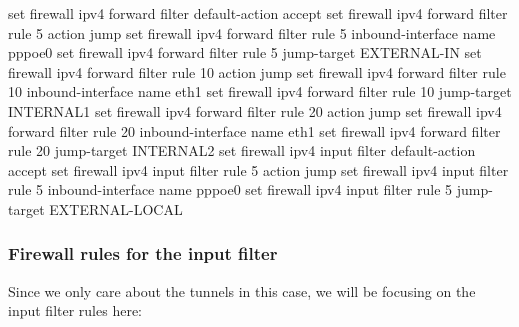 \documentclass[
]{article}
\newenvironment{Shaded}{\begin{snugshade}}{\end{snugshade}}
\newcommand{\BuiltInTok}[1]{#1}
\newcommand{\NormalTok}[1]{#1}
\newcommand{\StringTok}[1]{\textcolor[rgb]{0.31,0.60,0.02}{#1}}
\begin{document}
\begin{Shaded}
\begin{Highlighting}[numbers=left,,]
\BuiltInTok{set}\NormalTok{ firewall ipv4 forward filter default{-}action }\StringTok{\textquotesingle{}accept\textquotesingle{}}
\BuiltInTok{set}\NormalTok{ firewall ipv4 forward filter rule 5 action }\StringTok{\textquotesingle{}jump\textquotesingle{}}
\BuiltInTok{set}\NormalTok{ firewall ipv4 forward filter rule 5 inbound{-}interface name }\StringTok{\textquotesingle{}pppoe0\textquotesingle{}}
\BuiltInTok{set}\NormalTok{ firewall ipv4 forward filter rule 5 jump{-}target }\StringTok{\textquotesingle{}EXTERNAL{-}IN\textquotesingle{}}
\BuiltInTok{set}\NormalTok{ firewall ipv4 forward filter rule 10 action }\StringTok{\textquotesingle{}jump\textquotesingle{}}
\BuiltInTok{set}\NormalTok{ firewall ipv4 forward filter rule 10 inbound{-}interface name }\StringTok{\textquotesingle{}eth1\textquotesingle{}}
\BuiltInTok{set}\NormalTok{ firewall ipv4 forward filter rule 10 jump{-}target }\StringTok{\textquotesingle{}INTERNAL1\textquotesingle{}}
\BuiltInTok{set}\NormalTok{ firewall ipv4 forward filter rule 20 action }\StringTok{\textquotesingle{}jump\textquotesingle{}}
\BuiltInTok{set}\NormalTok{ firewall ipv4 forward filter rule 20 inbound{-}interface name }\StringTok{\textquotesingle{}eth1\textquotesingle{}}
\BuiltInTok{set}\NormalTok{ firewall ipv4 forward filter rule 20 jump{-}target }\StringTok{\textquotesingle{}INTERNAL2\textquotesingle{}}
\BuiltInTok{set}\NormalTok{ firewall ipv4 input filter default{-}action }\StringTok{\textquotesingle{}accept\textquotesingle{}}
\BuiltInTok{set}\NormalTok{ firewall ipv4 input filter rule 5 action }\StringTok{\textquotesingle{}jump\textquotesingle{}}
\BuiltInTok{set}\NormalTok{ firewall ipv4 input filter rule 5 inbound{-}interface name }\StringTok{\textquotesingle{}pppoe0\textquotesingle{}}
\BuiltInTok{set}\NormalTok{ firewall ipv4 input filter rule 5 jump{-}target }\StringTok{\textquotesingle{}EXTERNAL{-}LOCAL\textquotesingle{}}
\end{Highlighting}
\end{Shaded}

\newpage{}

\subsubsection{Firewall rules for the input
filter}\label{firewall-rules-for-the-input-filter}

Since we only care about the tunnels in this case, we will be focusing
on the input filter rules here:
\end{document}

